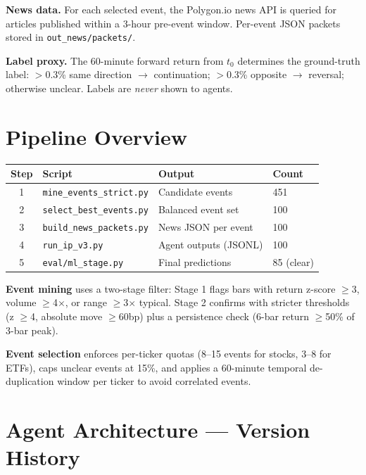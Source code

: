\documentclass[11pt, a4paper]{article}
\begin{document}
\textbf{News data.} For each selected event, the Polygon.io news API is queried for articles published within a 3-hour pre-event window. Per-event JSON packets stored in \texttt{out\_news/packets/}.

\textbf{Label proxy.} The 60-minute forward return from $t_0$ determines the ground-truth label: $>$0.3\% same direction $\to$ continuation; $>$0.3\% opposite $\to$ reversal; otherwise unclear. Labels are \emph{never} shown to agents.

\section{Pipeline Overview}

\begin{center}
\renewcommand{\arraystretch}{1.3}
\begin{tabular}{clll}
\toprule
\textbf{Step} & \textbf{Script} & \textbf{Output} & \textbf{Count} \\
\midrule
1 & \texttt{mine\_events\_strict.py} & Candidate events & 451 \\
2 & \texttt{select\_best\_events.py} & Balanced event set & 100 \\
3 & \texttt{build\_news\_packets.py} & News JSON per event & 100 \\
4 & \texttt{run\_ip\_v3.py} & Agent outputs (JSONL) & 100 \\
5 & \texttt{eval/ml\_stage.py} & Final predictions & 85 (clear) \\
\bottomrule
\end{tabular}
\end{center}

\textbf{Event mining} uses a two-stage filter: Stage 1 flags bars with return z-score $\geq$3, volume $\geq$4$\times$, or range $\geq$3$\times$ typical. Stage 2 confirms with stricter thresholds (z $\geq$4, absolute move $\geq$60bp) plus a persistence check (6-bar return $\geq$50\% of 3-bar peak).

\textbf{Event selection} enforces per-ticker quotas (8--15 events for stocks, 3--8 for ETFs), caps unclear events at 15\%, and applies a 60-minute temporal de-duplication window per ticker to avoid correlated events.

\section{Agent Architecture — Version History}
\end{document}
